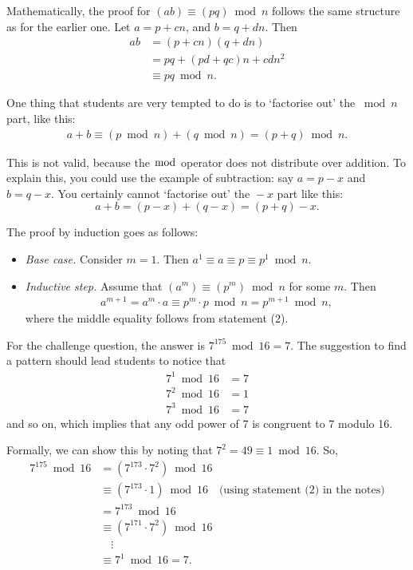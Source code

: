 \documentclass[12pt]{article}
\begin{document}
Mathematically, the proof for $(ab) \equiv (pq) \bmod n$ follows the same structure as for the earlier one.
Let $a = p + cn$, and $b = q + dn$. Then
\begin{align*}
    ab &= (p + cn)(q + dn) \\
       &= pq + (pd + qc)n + cdn^2 \\
       &\equiv pq \bmod n.
\end{align*}

One thing that students are very tempted to do is to `factorise out' the ${} \bmod n$ part, like this:
\begin{align*}
    a + b \equiv (p \bmod n) + (q \bmod n) = (p + q) \bmod n.
\end{align*}

This is not valid, because the $\bmod$ operator does not distribute over addition.
To explain this, you could use the example of subtraction: say $a = p - x$ and $b = q - x$.
You certainly cannot `factorise out' the ${}-x$ part like this:
\begin{equation*}
a + b = (p - x) + (q - x) = (p + q) - x.
\end{equation*}

The proof by induction goes as follows:

\begin{itemize}
    \item \textit{Base case.} Consider $m = 1$. Then $a^1 \equiv a \equiv p \equiv p^1 \bmod n$.
    \item \textit{Inductive step.} Assume that $(a^m) \equiv (p^m) \bmod n$ for some $m$. Then
        \begin{align*}
            a^{m+1} = a^m \cdot a \equiv p^m \cdot p \bmod n = p^{m+1} \bmod n,
        \end{align*}
        where the middle equality follows from statement (2).
\end{itemize}

For the challenge question, the answer is $7^{175} \bmod 16 = 7$.
The suggestion to find a pattern should lead students to notice that
\begin{align*}
    7^1 \bmod 16 &= 7 \\
    7^2 \bmod 16 &= 1 \\
    7^3 \bmod 16 &= 7
\end{align*}
and so on, which implies that any odd power of 7 is congruent to 7 modulo 16.

Formally, we can show this by noting that $7^2 = 49 \equiv 1 \bmod 16$. So,
\begin{align*}
    7^{175} \bmod 16 &= (7^{173} \cdot 7^2) \bmod 16 \\
                     &\equiv (7^{173} \cdot 1) \bmod 16 \quad \text{(using statement (2) in the notes)} \\
                     &= 7^{173} \bmod 16 \\
                     &\equiv (7^{171} \cdot 7^2) \bmod 16 \\
                     &\quad\vdots \\
                     &\equiv 7^1 \bmod 16 = 7.\\
\end{align*}
\end{document}

